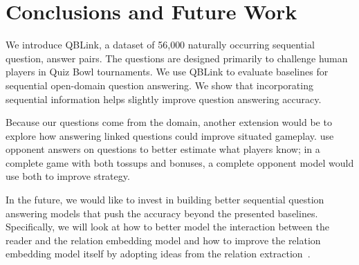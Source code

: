 \section{Conclusions and Future Work}

We introduce QBLink, a dataset of 56,000 naturally occurring
sequential question, answer pairs. The questions are designed
primarily to challenge human players in Quiz Bowl tournaments.  We use
QBLink to evaluate baselines for sequential open-domain question
answering. We show that incorporating sequential information helps
slightly improve question answering accuracy.

Because our questions come from the \qb{} domain, another extension
would be to explore how answering linked questions could improve
situated gameplay.   use opponent answers on
questions to better estimate what players know; in a complete game
with both tossups and bonuses, a complete opponent model would use
both to improve strategy.

In the future, we would like to invest in building better sequential
question answering models that push the accuracy beyond the presented
baselines. Specifically, we will look at how to better model the
interaction between the reader and the relation embedding model and
how to improve the relation embedding model itself by adopting ideas
from the relation
extraction~\cite{miwa2016end,peng2017cross,ammar2017ai2}.

